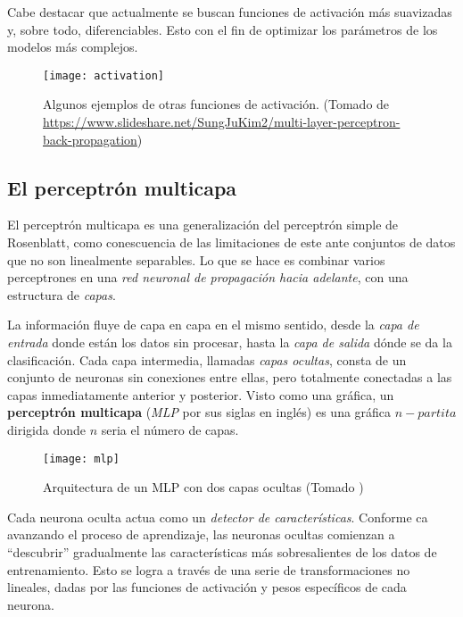 Cabe destacar que actualmente se buscan funciones de activación más
suavizadas y, sobre todo, diferenciables. Esto con el fin de optimizar
los parámetros de los modelos más complejos.

\begin{figure}[H]
  \texttt{[image: activation]}
  \centering
  \caption{Algunos ejemplos de otras funciones de activación.
  (Tomado de \url{https://www.slideshare.net/SungJuKim2/multi-layer-perceptron-back-propagation})}
\end{figure}

\subsection{El perceptrón multicapa}
El perceptrón multicapa es una generalización del perceptrón simple de Rosenblatt,
como conescuencia de las limitaciones de este ante conjuntos de datos que no son
linealmente separables. Lo que se hace es combinar varios perceptrones en una
\textit{red neuronal de propagación hacia adelante}, con una estructura de \textit{capas}.

La información fluye de capa en capa en el mismo sentido, desde la \textit{capa de entrada}
donde están los datos sin procesar, hasta la \textit{capa de salida} dónde se da
la clasificación. Cada capa intermedia, llamadas \textit{capas ocultas}, consta de un
conjunto de neuronas sin conexiones entre ellas, pero totalmente conectadas a las
capas inmediatamente anterior y posterior. Visto como una gráfica, un \textbf{perceptrón
  multicapa} (\textit{MLP} por sus siglas en inglés) es una gráfica $n-partita$ dirigida
donde $n$ seria el número de capas.
\begin{figure}[H]
  \texttt{[image: mlp]}
  \centering
  \caption{Arquitectura de un MLP con dos capas ocultas (Tomado \cite{haykin})}
\end{figure}
Cada neurona oculta actua como un \textit{detector de características}. Conforme
ca avanzando el proceso de aprendizaje, las neuronas ocultas comienzan a ``descubrir''
gradualmente las características más sobresalientes de los datos de entrenamiento.
Esto se logra a través de una serie de transformaciones no lineales, dadas por las
funciones de activación y pesos específicos de cada neurona.

